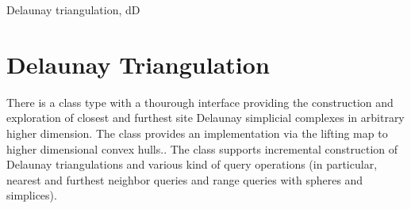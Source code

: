 \begin{ccPackage}{Delaunay triangulation, dD}
\section{Delaunay Triangulation}
  
There is a class type with a thourough interface providing the
construction and exploration of closest and furthest site Delaunay
simplicial complexes in arbitrary higher dimension.  The class
 provides an
implementation via the lifting map to higher dimensional
convex hulls..
The class supports incremental construction of Delaunay triangulations 
and various kind of query operations (in particular, nearest and furthest
neighbor queries and range queries with spheres and simplices).

\end{ccPackage}

